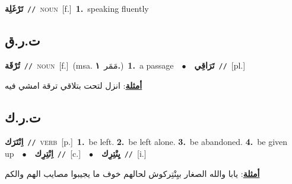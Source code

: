 \documentclass[10pt,a4paper,twoside]{article} %
\begin{document}
\begin{multicols}{2}
{\setlength\topsep{0pt}\textbf{\foreignlanguage{arabic}{تَرْغَلِة}}\ {\color{gray}\texttt{//}\color{black}}\ \textsc{noun}\ [f.]\ \textbf{1.}~speaking fluently\ } \vspace{2mm}

\vspace{-3mm}
\subsection*{\color{blue}\foreignlanguage{arabic}{ت.ر.ق}\color{blue}{}} 

{\setlength\topsep{0pt}\textbf{\foreignlanguage{arabic}{تُرْقَة}}\ {\color{gray}\texttt{//}\color{black}}\ \textsc{noun}\ [f.]\ \color{gray}(msa. \foreignlanguage{arabic}{مَمَر}~\foreignlanguage{arabic}{\textbf{١.}})\color{black}\ \textbf{1.}~a passage\ \ $\bullet$\ \ \setlength\topsep{0pt}\textbf{\foreignlanguage{arabic}{تَرَاقِي}}\ {\color{gray}\texttt{//}\color{black}}\ [pl.]\  \begin{flushright}\color{gray}\foreignlanguage{arabic}{\textbf{\underline{\foreignlanguage{arabic}{أمثلة}}}: انزل لتحت بتلاقي ترقة امشي فيه}\end{flushright}\color{black}} \vspace{2mm}

\vspace{-3mm}
\subsection*{\color{blue}\foreignlanguage{arabic}{ت.ر.ك}\color{blue}{}} 

{\setlength\topsep{0pt}\textbf{\foreignlanguage{arabic}{اِنْتَرَك}}\ {\color{gray}\texttt{//}\color{black}}\ \textsc{verb}\ [p.]\ \textbf{1.}~be left.  \textbf{2.}~be left alone.  \textbf{3.}~be abandoned.  \textbf{4.}~be given up\ \ $\bullet$\ \ \setlength\topsep{0pt}\textbf{\foreignlanguage{arabic}{اِنْتِرِك}}\ {\color{gray}\texttt{//}\color{black}}\ [c.]\ \ $\bullet$\ \ \setlength\topsep{0pt}\textbf{\foreignlanguage{arabic}{يِنْتِرِك}}\ {\color{gray}\texttt{//}\color{black}}\ [i.]\  \begin{flushright}\color{gray}\foreignlanguage{arabic}{\textbf{\underline{\foreignlanguage{arabic}{أمثلة}}}: يابا والله الصغار بيِنْتِركوش لحالهم خوف ما يجيبوا مصايب الهم والكم}\end{flushright}\color{black}} \vspace{2mm}


\end{multicols}
\end{document}
